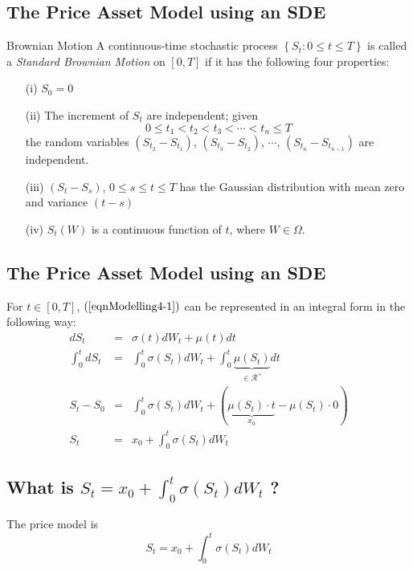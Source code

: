 \subsection{The Price Asset Model using an SDE}
Brownian Motion
A continuous-time stochastic process $\left\lbrace S_{t}: 0\leq t\leq T\right\rbrace$ is called a \textit{Standard
Brownian Motion} on $ \left[ 0, T\right]$ if it has the following four properties:
\begin{itemize}
\item[(i)]$S_{0} =0$
\item[(ii)] The increment of $S_{t}$ are independent; given $$0\leq t_{1}< t_{2}< t_{3}<\cdots<t_{n}\leq T$$ the random
variables $\left( S_{t_{2}} -S_{t_{1}}\right)$, $\left(S_{t_{3}} -S_{t_{2}} \right)$, $\cdots$, $\left( S_{t_{n}}
-S_{t_{n-1}}\right)$  are independent.
\item[(iii)]$\left( S_{t} -S_{s}\right)$, $0\leq s\leq t\leq T$ has the Gaussian distribution with mean zero and
variance $\left( t-s \right) $
\item[(iv)]$S_{t}(W)$ is a continuous function of $t$, where $W \in \Omega$.
\end{itemize} 


\subsection{The Price Asset Model using an SDE}
For $t \in [0,T]$, $(\ref{eqnModelling4-1})$ can be represented in an integral form in the following way:
\begin{eqnarray*}
dS_t &=& \sigma(t)dW_t+\mu(t)dt\\
\int_0^t dS_t &=& \int_0^t \sigma \left(S_t\right)dW_t+\int_0^t \underbrace{\mu\left(S_t\right)}_{\in
\mathcal{R}^+}dt\\
S_t - S_0   &=& \int_0^t \sigma\left(S_t\right)dW_t+ \left( \underbrace{\mu\left(S_t\right) \cdot t}_{ x_0} -
\mu\left(S_t \right) \cdot 0\right) \\
S_t &=& x_0 + \int_0^t \sigma\left(S_t\right)dW_t
\end{eqnarray*} 

\subsection{What is $S_t = x_0 + \int_0^t \sigma\left(S_t\right)dW_t$ ?}
The price model is
\begin{equation}\label{eqnModelling6-1}
S_t = x_0 + \int_0^t \sigma\left(S_t\right)dW_t
\end{equation}

